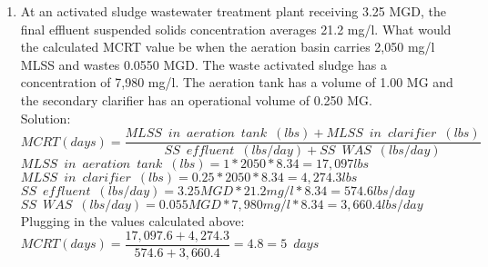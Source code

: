 \begin{enumerate}
\item At an activated sludge wastewater treatment plant receiving 3.25 MGD, the final effluent suspended solids concentration averages 21.2 mg/l. What would the calculated MCRT value be when the aeration basin carries 2,050 mg/l MLSS and wastes 0.0550 MGD. The waste activated sludge has a concentration of 7,980 mg/l. The aeration tank has a volume of 1.00 MG and the secondary clarifier has an operational volume of 0.250 MG.\\
Solution:\\
\vspace{0.3cm}
$MCRT (days) =  \dfrac{MLSS \enspace in \enspace aeration \enspace tank \enspace (lbs)+MLSS \enspace in \enspace clarifier \enspace (lbs)}{SS \enspace effluent \enspace (lbs/day)+SS \enspace WAS \enspace (lbs/day)}$\\
\vspace{0.3cm} 
$MLSS \enspace in \enspace aeration \enspace tank \enspace (lbs)=1*2050*8.34=17,097lbs$\\
\vspace{0.3cm} 
$MLSS \enspace in \enspace clarifier \enspace (lbs)=0.25*2050*8.34=4,274.3lbs$\\
\vspace{0.3cm} 
$SS \enspace effluent \enspace (lbs/day)=3.25MGD *21.2mg/l*8.34=574.6 lbs/day$\\
\vspace{0.3cm} 
$SS \enspace WAS \enspace (lbs/day)=0.055MGD *7,980mg/l*8.34=3,660.4lbs/day$\\
\vspace{0.3cm} 
Plugging in the values calculated above: $MCRT (days) =  \dfrac{17,097.6+4,274.3}{574.6+3,660.4}=4.8=\boxed{5 \enspace days}$\\
\vspace{0.2cm}






\end{enumerate}
